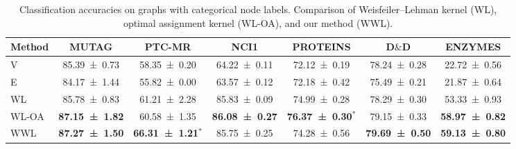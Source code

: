 \documentclass{article}
\begin{document}
\begin{table}[t]
\centering
\caption{Classification accuracies on graphs with categorical node labels. Comparison of Weisfeiler--Lehman kernel (WL), optimal assignment kernel (WL-OA), and our method (WWL).}
\label{results_disc}

  \renewrobustcmd{\boldmath}{}
  \fontsize{9.5}{10.5}\selectfont
\begin{sc}
    \setlength{\tabcolsep}{5.00pt}
    
\begin{tabular}{lcccccc}
    \toprule
    Method & MUTAG & PTC-MR & NCI1  & PROTEINS & D$\&$D & ENZYMES\\
    \midrule
V & \num{85.39 \pm 0.73} & \num{58.35 \pm 0.20}\phantom{$^\ast$} & \num{64.22 \pm 0.11} & \num{72.12 \pm 0.19}\phantom{$^\ast$} & \num{78.24 \pm 0.28} & \num{22.72 \pm 0.56}\\
E & \num{84.17 \pm 1.44} & \num{55.82 \pm 0.00}\phantom{$^\ast$} & \num{63.57 \pm 0.12} & \num{72.18 \pm 0.42}\phantom{$^\ast$} & \num{75.49 \pm 0.21} & \num{21.87 \pm 0.64}\\
\midrule
WL    & \num{85.78 \pm 0.83} & \num{61.21 \pm 2.28}\phantom{$^\ast$} & \num{85.83 \pm 0.09}  & \num{74.99 \pm 0.28}\phantom{$^\ast$} & \num{78.29 \pm 0.30} & \num{53.33 \pm 0.93}\\
WL-OA & \bfseries\num{87.15 \pm 1.82} & \num{60.58 \pm 1.35}\phantom{$^\ast$} & \bfseries\num{86.08 \pm 0.27} &  \bfseries\num{76.37 \pm 0.30}$^\ast$ & \num{79.15 \pm 0.33} & \bfseries\num{58.97 \pm 0.82}\\
\midrule
WWL  & \bfseries\num{87.27 \pm 1.50} & \bfseries\num{66.31 \pm  1.21}$^\ast$ & \num{85.75 \pm 0.25} &  \num{74.28 \pm 0.56}\phantom{$^\ast$} & \bfseries\num{79.69 \pm 0.50} & \bfseries\num{59.13 \pm 0.80}\\
    \bottomrule
    \end{tabular}
\end{sc}
\end{table}
\end{document}
